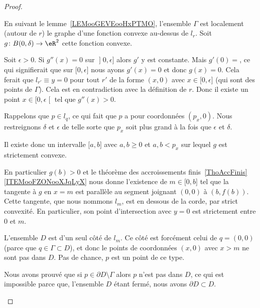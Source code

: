 \begin{proof}
\begin{subproof}
		 En suivant le lemme~\ref{LEMooGEVEooHxPTMO}, l'ensemble \( \Gamma\) est localement (autour de \( r\)) le graphe d'une fonction convexe au-dessus de \( l_r\). Soit \( g\colon B(0,\delta)\to \eR^2\) cette fonction convexe.

		Soit \( \epsilon>0\). Si \( g''(x)=0\) sur \( \mathopen] 0 , \epsilon \mathclose]\) alors \( g'\) y est constante. Mais \( g'(0)=\), ce qui signifierait que sur \( \mathopen[ 0 , \epsilon \mathclose]\) nous ayons \( g'(x)=0\) et donc \( g(x)=0\). Cela ferait que \( l_{r'}\equiv y=0\) pour tout \( r'\) de la forme \( (x,0)\) avec \( x\in \mathopen[ 0 , \epsilon \mathclose]\) (qui sont des points de \( \Gamma\)). Cela est en contradiction avec la définition de \( r\). Donc il existe un point \(x\in \mathopen[ 0 , \epsilon \mathclose[\) tel que \( g''(x)>0\).

		Rappelons que \( p\in l_q\), ce qui fait que \( p\) a pour coordonnées \( (p_x,0)\). Nous restreignons \( \delta\) et \( \epsilon\) de telle sorte que \( p_x\) soit plus grand à la fois que \( \epsilon\) et \(\delta\).

		Il existe donc un intervalle \( \mathopen[ a , b \mathclose]\) avec \( a,b\geq 0\) et \( a,b<p_x\) sur lequel \( g\) est strictement convexe.


		En particulier \( g(b)>0\) et le théorème des accroissements finis~\ref{ThoAccFinis}\ref{ITEMooFZONooXJqLyX} nous donne l'existence de \( m\in\mathopen[ 0 , b \mathclose]\) tel que la tangente à \( g\) en \( x=m\) est parallèle au segment joignant \( (0,0)\) à \( (b,f(b))\). Cette tangente, que nous nommons \( l_m\), est en dessous de la corde, par strict convexité. En particulier, son point d'intersection avec \( y=0\) est strictement entre \( 0\) et \( m\).

		L'ensemble \( D\) est d'un seul côté de \(l_m\). Ce côté est forcément celui de \( q=(0,0)\) (parce que \( q\in \Gamma\subset D\)), et donc le points de coordonnées \( (x,0)\) avec \( x>m\) ne sont pas dans \(D\). Pas de chance, \( p\) est un point de ce type.

		\spitem[La contradiction]
		Nous avons prouvé que si \( p\in \partial D\setminus \Gamma\) alors \( p\) n'est pas dans \( D\), ce qui est impossible parce que, l'ensemble \( D\) étant fermé, nous avons \( \partial D\subset D\).
	\end{subproof}
\end{proof}

